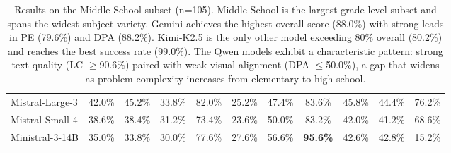\documentclass[11pt]{article}
\begin{document}
\begin{table}[!ht]
{\begin{tabular}{lcccc|cccc|cc}
Mistral-Large-3        & 42.0\% & 45.2\% & 33.8\% & 82.0\% & 25.2\% & 47.4\% & 83.6\% & 45.8\% & 44.4\% & 76.2\% \\
Mistral-Small-4        & 38.6\% & 38.4\% & 31.2\% & 73.4\% & 23.6\% & 50.0\% & 83.2\% & 42.0\% & 41.2\% & 68.6\% \\
Ministral-3-14B        & 35.0\% & 33.8\% & 30.0\% & 77.6\% & 27.6\% & 56.6\% & \textbf{95.6\%} & 42.6\% & 42.8\% & 15.2\% \\
\bottomrule
\end{tabular}}
\caption{Results on the Middle School subset (n=105). Middle School is the largest grade-level subset and spans the widest subject variety. Gemini achieves the highest overall score (88.0\%) with strong leads in PE (79.6\%) and DPA (88.2\%). Kimi-K2.5 is the only other model exceeding 80\% overall (80.2\%) and reaches the best success rate (99.0\%). The Qwen models exhibit a characteristic pattern: strong text quality (LC $\geq$90.6\%) paired with weak visual alignment (DPA $\leq$50.0\%), a gap that widens as problem complexity increases from elementary to high school.}
\label{tab:results-middleschool}
\end{table}
\end{document}
